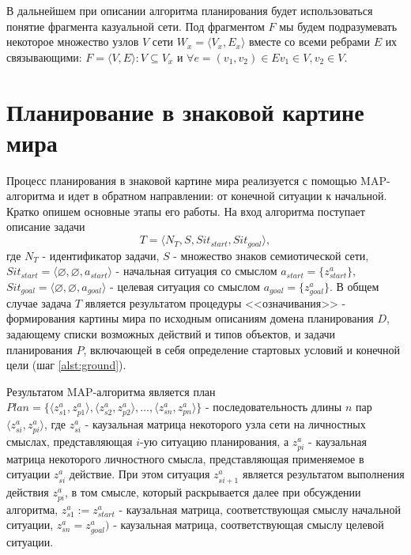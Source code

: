 \documentclass[12pt]{scrartcl}
\newcommand{\linesprval}{1}
\begin{document}
	В дальнейшем при описании алгоритма планирования будет использоваться понятие фрагмента казуальной сети. Под фрагментом $F$ мы будем подразумевать некоторое множество узлов $V$ сети $W_x=\langle V_x,E_x\rangle$ вместе со всеми ребрами $E$ их связывающими: $F=\langle V,E\rangle: V\subseteq V_x$ и $\forall e=(v_1,v_2)\in E v_1\in V, v_2\in V$.
	
	\section{Планирование в знаковой картине мира}\label{sec:plan}
	
	Процесс планирования в знаковой картине мира реализуется с помощью MAP-алгоритма и идет в обратном направлении: от конечной ситуации к начальной. Кратко опишем основные этапы его работы. На вход алгоритма поступает описание задачи 
	\[T = \langle N_T,S,Sit_{start}, Sit_{goal}\rangle,\]
	где $N_T$ - идентификатор задачи, $S$ - множество знаков семиотической сети, $Sit_{start}=\langle \varnothing, \varnothing, a_{start} \rangle$ - начальная ситуация со смыслом $a_{start}=\{z_{start}^a\}$, $Sit_{goal}=\langle \varnothing, \varnothing, a_{goal} \rangle$ - целевая ситуация со смыслом $a_{goal}=\{z_{goal}^a\}$. В общем случае задача $T$ является результатом процедуры <<означивания>> - формирования картины мира по исходным описаниям домена планирования $D$, задающему списки возможных действий и типов объектов, и задачи планирования $P$, включающей в себя определение стартовых условий и конечной цели (шаг \ref{alst:ground}).

	Результатом MAP-алгоритма является план $Plan=\{\langle z_{s1}^a,z_{p1}^a\rangle, \langle z_{s2}^a,z_{p2}^a\rangle,\dots, \langle z_{sn}^a,z_{pn}^a\rangle\}$ - последовательность длины $n$ пар $\langle z_{si}^a,z_{pi}^a\rangle$, где $z_{si}^a$ - каузальная матрица некоторого узла сети на личностных смыслах, представляющая $i$-ую ситуацию планирования, а $z_{pi}^a$ - каузальная матрица некоторого личностного смысла, представляющая применяемое в ситуации $z_{si}^a$ действие. При этом ситуация $z_{si+1}^a$ является результатом выполнения действия $z_{pi}^a$, в том смысле, который раскрывается далее при обсуждении алгоритма, $z_{s1}^a := z_{start}^a$ - каузальная матрица, соответствующая смыслу начальной ситуации, $z_{sn}^a=z_{goal}^a)$ - каузальная матрица, соответствующая смыслу целевой ситуации.

	\linespread{1}	
	\begin{algorithm}[H]
		\label{alg:plan}
		\begin{algorithmic}[1]
			
		\end{algorithmic}
	\end{algorithm}
	\linespread{\linesprval}
		
\end{document}
